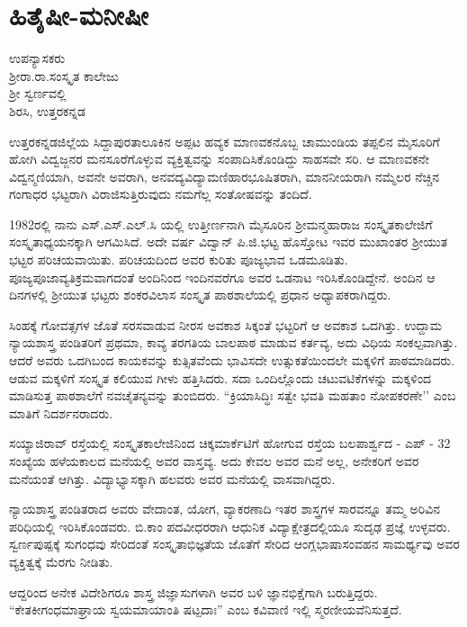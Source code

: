 \chapter{ಹಿತೈಷೀ-ಮನೀಷೀ}

\begin{center}
\smallskip

ಉಪನ್ಯಾಸಕರು\\ 
ಶ್ರೀರಾ.ರಾ.ಸಂಸ್ಕೃತ ಕಾಲೇಜು\\
ಶ್ರೀ ಸ್ವರ್ಣವಲ್ಲಿ\\
ಶಿರಸಿ, ಉತ್ತರಕನ್ನಡ
\end{center}

ಉತ್ತರಕನ್ನಡಜಿಲ್ಲೆಯ ಸಿದ್ದಾಪುರತಾಲೂಕಿನ ಅಪ್ಪಟ ಹವ್ಯಕ ಮಾಣವಕನೊಬ್ಬ ಚಾಮುಂಡಿಯ ತಪ್ಪಲಿನ ಮೈಸೂರಿಗೆ ಹೋಗಿ ವಿದ್ವಜ್ಜನರ ಮನಸೂರೆಗೊಳ್ಳುವ ವ್ಯಕ್ತಿತ್ವವನ್ನು ಸಂಪಾದಿಸಿಕೊಂಡಿದ್ದು ಸಾಹಸವೇ ಸರಿ. ಆ ಮಾಣವಕನೇ ವಿದ್ವನ್ಮಣಿಯಾಗಿ, ಅವನೇ ಅವರಾಗಿ, ಅನವದ್ಯವಿದ್ಯಾಮಣಿಹಾರಭೂಷಿತರಾಗಿ, ಮಾನನೀಯರಾಗಿ ನಮ್ಮೆಲರ ನೆಚ್ಚಿನ ಗಂಗಾಧರ ಭಟ್ಟರಾಗಿ ವಿರಾಜಿಸುತ್ತಿರುವುದು ನಮಗೆಲ್ಲ ಸಂತೋಷವನ್ನು ತಂದಿದೆ.

1982ರಲ್ಲಿ ನಾನು  ಎಸ್.ಎಸ್.ಎಲ್.ಸಿ ಯಲ್ಲಿ ಉತ್ತೀರ್ಣನಾಗಿ ಮೈಸೂರಿನ ಶ್ರೀಮನ್ಮಹಾರಾಜ ಸಂಸ್ಕೃತಕಾಲೇಜಿಗೆ ಸಂಸ್ಕೃತಾಧ್ಯಯನಕ್ಕಾಗಿ ಆಗಮಿಸಿದೆ. ಅದೇ ವರ್ಷ ವಿದ್ವಾನ್ ಪಿ.ಜಿ.ಭಟ್ಟ ಹೊಸ್ತೋಟ ಇವರ ಮುಖಾಂತರ ಶ್ರೀಯುತ ಭಟ್ಟರ ಪರಿಚಯವಾಯಿತು. ಪರಿಚಯದಿಂದ ಅವರ ಕುರಿತು ಪೂಜ್ಯಭಾವ ಒಡಮೂಡಿತು. ಪೂಜ್ಯಪೂಜಾವ್ಯತಿಕ್ರಮವಾಗದಂತೆ ಅಂದಿನಿಂದ ಇಂದಿನವರೆಗೂ ಅವರ ಒಡನಾಟ ಇರಿಸಿಕೊಂಡಿದ್ದೇನೆ. ಅಂದಿನ ಆ ದಿನಗಳಲ್ಲಿ ಶ್ರೀಯುತ ಭಟ್ಟರು ಶಂಕರವಿಲಾಸ ಸಂಸ್ಕೃತ ಪಾಠಶಾಲೆಯಲ್ಲಿ ಪ್ರಧಾನ ಅಧ್ಯಾಪಕರಾಗಿದ್ದರು.

ಸಿಂಹಕ್ಕೆ ಗೋವತ್ಸಗಳ ಜೊತೆ ಸರಸವಾಡುವ ನೀರಸ ಅವಕಾಶ ಸಿಕ್ಕಂತೆ ಭಟ್ಟರಿಗೆ ಆ ಅವಕಾಶ ಒದಗಿತ್ತು. ಉದ್ದಾಮ ನ್ಯಾಯಶಾಸ್ತ್ರ ಪಂಡಿತರಿಗೆ ಪ್ರಥಮಾ, ಕಾವ್ಯ ತರಗತಿಯ ಬಾಲಪಾಠ ಮಾಡುವ ಕರ್ತವ್ಯ, ಅದು ವಿಧಿಯ ಸಂಕಲ್ಪವಾಗಿತ್ತು.  ಆದರೆ ಅವರು ಒದಗಿಬಂದ ಕಾಯಕವನ್ನು ಕುತ್ಸಿತವೆಂದು ಭಾವಿಸದೇ  ಉತ್ಸುಕತೆಯಿಂದಲೇ ಮಕ್ಕಳಿಗೆ ಪಾಠಮಾಡಿದರು. ಆಡುವ ಮಕ್ಕಳಿಗೆ ಸಂಸ್ಕೃತ ಕಲಿಯುವ ಗೀಳು ಹತ್ತಿಸಿದರು. ಸದಾ ಒಂದಿಲ್ಲೊಂದು ಚಟುವಟಿಕೆಗಳನ್ನು ಮಕ್ಕಳಿಂದ ಮಾಡಿಸುತ್ತ ಪಾಠಶಾಲೆಗೆ ನವಚೈತನ್ಯವನ್ನು ತುಂಬಿದರು. “ಕ್ರಿಯಾಸಿದ್ಧಿಃ ಸತ್ವೇ ಭವತಿ ಮಹತಾಂ ನೋಪಕರಣೇ’’ ಎಂಬ ಮಾತಿಗೆ ನಿದರ್ಶನರಾದರು.

ಸಯ್ಯಾಜಿರಾವ್ ರಸ್ತೆಯಲ್ಲಿ ಸಂಸ್ಕೃತಕಾಲೇಜಿನಿಂದ ಚಿಕ್ಕಮಾರ್ಕೆಟಿಗೆ ಹೋಗುವ ರಸ್ತೆಯ ಬಲಪಾರ್ಶ್ವದ - ಎಪ್ - 32 ಸಂಖ್ಯೆಯ ಹಳೆಯಕಾಲದ ಮನೆಯಲ್ಲಿ ಅವರ ವಾಸ್ತವ್ಯ. ಅದು ಕೇವಲ ಅವರ ಮನೆ ಅಲ್ಲ, ಅನೇಕರಿಗೆ ಅವರ ಮನೆಯಂತೆ ಆಗಿತ್ತು. ವಿದ್ಯಾಭ್ಯಾಸಕ್ಕಾಗಿ ಹಲವರು ಅವರ ಮನೆಯಲ್ಲಿ ವಾಸವಾಗಿದ್ದರು.

ನ್ಯಾಯಶಾಸ್ತ್ರ ಪಂಡಿತರಾದ ಅವರು ವೇದಾಂತ, ಯೋಗ, ವ್ಯಾಕರಣಾದಿ ಇತರ ಶಾಸ್ತ್ರಗಳ ಸಾರವನ್ನೂ ತಮ್ಮ ಅರಿವಿನ ಪರಿಧಿಯಲ್ಲಿ ಇರಿಸಿಕೊಂಡವರು. ಬಿ.ಕಾಂ ಪದವೀಧರರಾಗಿ ಆಧುನಿಕ ವಿದ್ಯಾಕ್ಷೇತ್ರದಲ್ಲಿಯೂ ಸುದೃಢ ಪ್ರಜ್ಞೆ ಉಳ್ಳವರು. ಸ್ವರ್ಣಪುಷ್ಪಕ್ಕೆ ಸುಗಂಧವು ಸೇರಿದಂತೆ ಸಂಸ್ಕೃತಾಭಿಜ್ಞತೆಯ ಜೊತೆಗೆ ಸೇರಿದ ಆಂಗ್ಲಭಾಷಾಸಂವಹನ ಸಾಮರ್ಥ್ಯವು ಅವರ ವ್ಯಕ್ತಿತ್ವಕ್ಕೆ ಮೆರಗು ನೀಡಿತು. 

ಆದ್ದರಿಂದ ಅನೇಕ ವಿದೇಶಿಗರೂ ಶಾಸ್ತ್ರ ಜಿಜ್ಞಾಸುಗಳಾಗಿ ಅವರ ಬಳಿ ಜ್ಞಾನಭಿಕ್ಷೆಗಾಗಿ ಬರುತ್ತಿದ್ದರು. “ಕೇತಕೀಗಂಧಮಾಘ್ರಾಯ ಸ್ವಯಮಾಯಾಂತಿ ಷಟ್ಪದಾಃ” ಎಂಬ ಕವಿವಾಣಿ ಇಲ್ಲಿ ಸ್ಮರಣೀಯವೆನಿಸುತ್ತದೆ.

